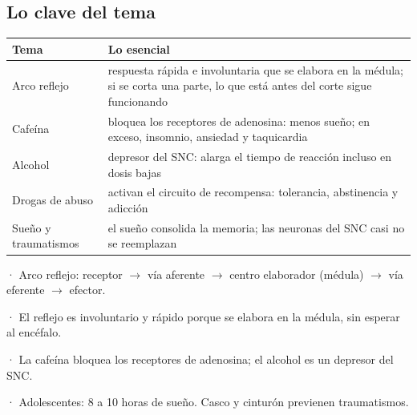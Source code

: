 \subsection{Lo clave del tema}
\begin{center}\small
\begin{tabularx}{\linewidth}{@{}>{\raggedright\arraybackslash\hsize=0.67\hsize}X>{\raggedright\arraybackslash\hsize=1.33\hsize}X@{}}
\toprule
\textbf{Tema} & \textbf{Lo esencial} \\
\midrule
Arco reflejo & respuesta rápida e involuntaria que se elabora en la médula; si se corta una parte, lo que está antes del corte sigue funcionando \\
Cafeína & bloquea los receptores de adenosina: menos sueño; en exceso, insomnio, ansiedad y taquicardia \\
Alcohol & depresor del SNC: alarga el tiempo de reacción incluso en dosis bajas \\
Drogas de abuso & activan el circuito de recompensa: tolerancia, abstinencia y adicción \\
Sueño y traumatismos & el sueño consolida la memoria; las neuronas del SNC casi no se reemplazan \\
\bottomrule
\end{tabularx}
\end{center}
 
\begin{clave}[{Recuerda}] · Arco reflejo: receptor \ensuremath{\rightarrow} vía aferente \ensuremath{\rightarrow} centro elaborador (médula) \ensuremath{\rightarrow} vía eferente \ensuremath{\rightarrow} efector.\par · El reflejo es involuntario y rápido porque se elabora en la médula, sin esperar al encéfalo.\par · La cafeína bloquea los receptores de adenosina; el alcohol es un depresor del SNC.\par · Adolescentes: 8 a 10 horas de sueño. Casco y cinturón previenen traumatismos.\end{clave}
 
